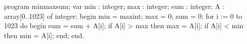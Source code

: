 program minmaxsum;
var
  min : integer;
  max : integer;
  sum : integer;
  A : array[0..1023] of integer;
begin
  min = maxint;
  max = 0;
  sum = 0;
  for i := 0 to 1023 do
  begin
	sum = sum + A[i];
	if A[i] > max then
	  max = A[i];
	if A[i] < min then
	  min = A[i];
  end;
end.